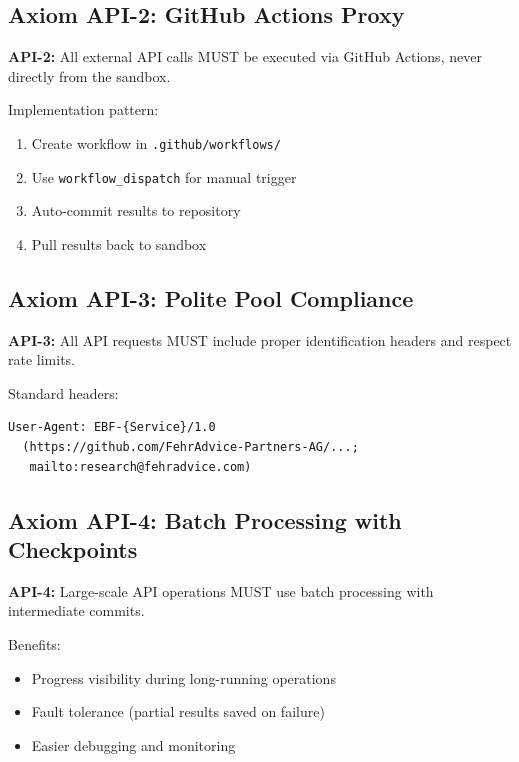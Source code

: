 \subsection{Axiom API-2: GitHub Actions Proxy}

\begin{tcolorbox}[colback=blue!5, colframe=blue!50]
\textbf{API-2:} All external API calls MUST be executed via GitHub Actions, never directly from the sandbox.
\end{tcolorbox}

Implementation pattern:
\begin{enumerate}
    \item Create workflow in \texttt{.github/workflows/}
    \item Use \texttt{workflow\_dispatch} for manual trigger
    \item Auto-commit results to repository
    \item Pull results back to sandbox
\end{enumerate}

\subsection{Axiom API-3: Polite Pool Compliance}

\begin{tcolorbox}[colback=blue!5, colframe=blue!50]
\textbf{API-3:} All API requests MUST include proper identification headers and respect rate limits.
\end{tcolorbox}

Standard headers:
\begin{verbatim}
User-Agent: EBF-{Service}/1.0
  (https://github.com/FehrAdvice-Partners-AG/...;
   mailto:research@fehradvice.com)
\end{verbatim}

\subsection{Axiom API-4: Batch Processing with Checkpoints}

\begin{tcolorbox}[colback=blue!5, colframe=blue!50]
\textbf{API-4:} Large-scale API operations MUST use batch processing with intermediate commits.
\end{tcolorbox}

Benefits:
\begin{itemize}
    \item Progress visibility during long-running operations
    \item Fault tolerance (partial results saved on failure)
    \item Easier debugging and monitoring
\end{itemize}

